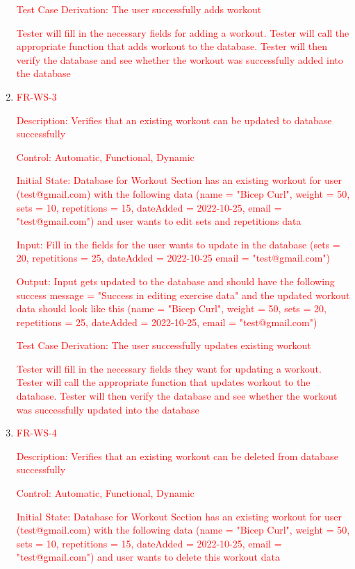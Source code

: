 \documentclass[12pt, titlepage]{article}
\begin{document}
\begin{enumerate}
	\textcolor{red}{Test Case Derivation: The user successfully adds workout}
	
	\textcolor{red}{ Tester will fill in the necessary fields for adding a workout. Tester will call the appropriate function that adds workout to the database. Tester will then verify the database and see whether the workout was successfully added into the database}

  \item{\textcolor{red}{FR-WS-3\\}}

 \textcolor{red}{Description: Verifies that an existing workout can be updated to database successfully}
	
	\textcolor{red}{Control: Automatic, Functional, Dynamic}
	
	\textcolor{red}{Initial State: Database for Workout Section has an existing workout for user (test@gmail.com) with the following data (name = "Bicep Curl", weight = 50, sets = 10, repetitions = 15, dateAdded = 2022-10-25, email = "test@gmail.com") and user wants to edit sets and repetitions data}
	
	\textcolor{red}{Input: Fill in the fields for the user wants to update in the database (sets = 20, repetitions = 25, dateAdded = 2022-10-25 email = "test@gmail.com")}
	
	\textcolor{red}{Output: Input gets updated to the database and should have the following success message = "Success in editing exercise data" and the updated workout data should look like this (name = "Bicep Curl", weight = 50, sets = 20, repetitions = 25, dateAdded = 2022-10-25, email = "test@gmail.com")}
	
	\textcolor{red}{Test Case Derivation: The user successfully updates existing workout}
	
	\textcolor{red}{Tester will fill in the necessary fields they want for updating a workout. Tester will call the appropriate function that updates workout to the database. Tester will then verify the database and see whether the workout was successfully updated into the database}

  \item{\textcolor{red}{FR-WS-4\\}}

 \textcolor{red}{Description: Verifies that an existing workout can be deleted from database successfully}
	
	\textcolor{red}{Control: Automatic, Functional, Dynamic}
	
	\textcolor{red}{Initial State: Database for Workout Section has an existing workout for user (test@gmail.com) with the following data (name = "Bicep Curl", weight = 50, sets = 10, repetitions = 15, dateAdded = 2022-10-25, email = "test@gmail.com") and user wants to delete this workout data}
	

\end{enumerate}
\end{document}
